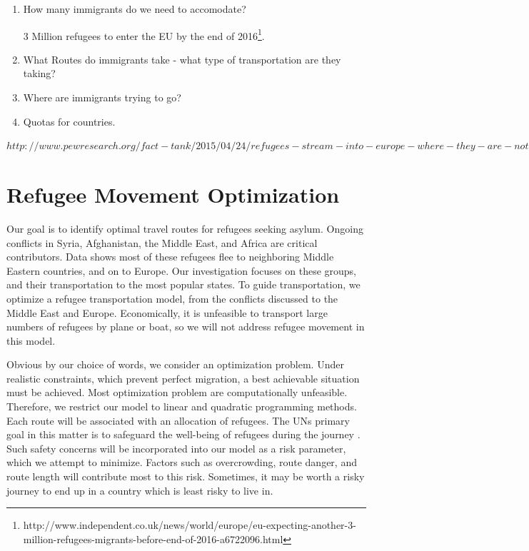 \documentclass{article}
\begin{document}
\begin{enumerate}
    \item How many immigrants do we need to accomodate?

    3 Million refugees to enter the EU by the end of 2016\footnote{http://www.independent.co.uk/news/world/europe/eu-expecting-another-3-million-refugees-migrants-before-end-of-2016-a6722096.html}.

    \item What Routes do immigrants take - what type of transportation are they taking?

    \item Where are immigrants trying to go?

    \item Quotas for countries.
\end{enumerate}

$http://www.pewresearch.org/fact-tank/2015/04/24/refugees-stream-into-europe-where-they-are-not-welcomed-with-open-arms/ft_15-04-22_eu-immigration/$


\section{Refugee Movement Optimization}

Our goal is to identify optimal travel routes for refugees seeking asylum. Ongoing conflicts in Syria, Afghanistan, the Middle East, and Africa are critical contributors\cite{refugeefactsheet}. Data shows most of these refugees flee to neighboring Middle Eastern countries, and on to Europe\cite{refugeefactsheet}. Our investigation focuses on these groups, and their transportation to the most popular states. To guide transportation, we optimize a refugee transportation model, from the conflicts discussed to the Middle East and Europe. Economically, it is unfeasible to transport large numbers of refugees by plane or boat, so we will not address refugee movement in this model.

Obvious by our choice of words, we consider an optimization problem. Under realistic constraints, which prevent perfect migration, a best achievable situation must be achieved. Most optimization problem are computationally unfeasible. Therefore, we restrict our model to linear and quadratic programming methods. Each route will be associated with an allocation of refugees. The UNs primary goal in this matter is to safeguard the well-being of refugees during the journey \cite{UNStatement}. Such safety concerns will be incorporated into our model as a risk parameter, which we attempt to minimize. Factors such as overcrowding, route danger, and route length will contribute most to this risk. Sometimes, it may be worth a risky journey to end up in a country which is least risky to live in.
\end{document}
